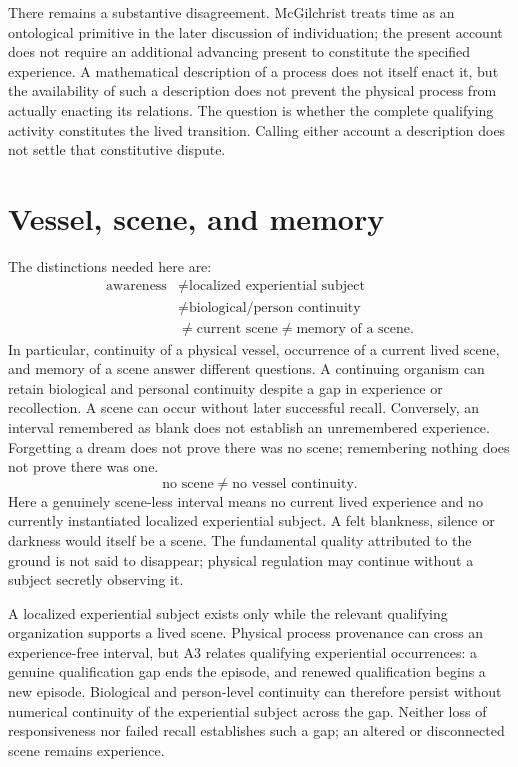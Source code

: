 There remains a substantive disagreement. McGilchrist treats time as an ontological primitive in the later discussion of individuation; the present account does not require an additional advancing present to constitute the specified experience. A mathematical description of a process does not itself enact it, but the availability of such a description does not prevent the physical process from actually enacting its relations. The question is whether the complete qualifying activity constitutes the lived transition. Calling either account a description does not settle that constitutive dispute.

\section{Vessel, scene, and memory}\label{sec:vessel-scene-memory}
The distinctions needed here are:
\[
\boxed{\begin{aligned}
\text{awareness}&\neq\text{localized experiential subject}\\
&\neq\text{biological/person continuity}\\
&\neq\text{current scene}\neq\text{memory of a scene}.
\end{aligned}}
\]
In particular, continuity of a physical vessel, occurrence of a current lived scene, and memory of a scene answer different questions. A continuing organism can retain biological and personal continuity despite a gap in experience or recollection. A scene can occur without later successful recall. Conversely, an interval remembered as blank does not establish an unremembered experience. Forgetting a dream does not prove there was no scene; remembering nothing does not prove there was one.
\[
\boxed{\text{no scene}\neq\text{no vessel continuity}.}
\]
Here a genuinely scene-less interval means no current lived experience and no currently instantiated localized experiential subject. A felt blankness, silence or darkness would itself be a scene. The fundamental quality attributed to the ground is not said to disappear; physical regulation may continue without a subject secretly observing it.

A localized experiential subject exists only while the relevant qualifying organization supports a lived scene. Physical process provenance can cross an experience-free interval, but A3 relates qualifying experiential occurrences: a genuine qualification gap ends the episode, and renewed qualification begins a new episode. Biological and person-level continuity can therefore persist without numerical continuity of the experiential subject across the gap. Neither loss of responsiveness nor failed recall establishes such a gap; an altered or disconnected scene remains experience.

